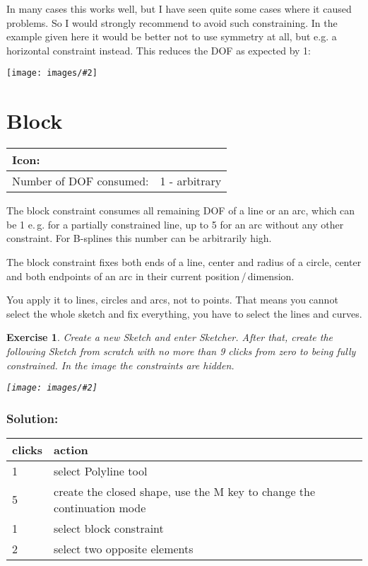 \documentclass[12pt,titlepage]{article}
\newcommand{\icon}[1]{\raisebox{-1em}{\rule{0pt}{27pt}\texttt{[image: images/\#1]}}}
\newcommand{\img}[2]{\vspace{2ex}\noindent\texttt{[image: images/\#2]}}
\newcommand{\dofConsumed}{Number of DOF consumed:}
\newtheorem{Exercise}{Exercise}
\begin{document}
In many cases this works well, but I have seen quite some cases where it caused problems. So I would strongly recommend to avoid such constraining. In the example given here it would be better not to use symmetry at all, but e.g. a horizontal constraint instead. This reduces the DOF as expected by 1:

\img{width=0.6\textwidth}{SymmetryPatho4}


\section{Block} \begin{tabular}{|l|l|} \hline Icon: & \icon{Sketcher_ConstrainBlock}\\ \hline \dofConsumed & 1 - arbitrary \\ \hline \end{tabular}

The block constraint consumes all remaining DOF of a line or an arc, which can be 1 e.\,g. for a partially constrained line, up to 5 for an arc without any other constraint. For B-splines this number can be arbitrarily high.

The block constraint fixes both ends of a line, center and radius of a circle, center and both endpoints of an arc in their current position\,/\,dimension.

You apply it to lines, circles and arcs, not to points. That means you cannot select the whole sketch and fix everything, you have to select the lines and curves.

\begin{Exercise} Create a new Sketch and enter Sketcher. After that, create the following Sketch from scratch with no more than 9 clicks from zero to being fully constrained. In the image the constraints are hidden.
	
	\img{}{BlockHidden} \end{Exercise}

\subsubsection*{Solution:}

\begin{tabular}{|l|l|} \hline {\bf clicks} & {\bf action}\\ \hline 1  & select Polyline tool\\ 5  & create the closed shape, use the M key to change the continuation mode\\ 1  & select block constraint\\ 2  & select two opposite elements\\ \hline \end{tabular}
\end{document}
